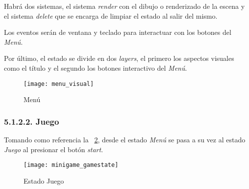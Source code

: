 Habrá dos sistemas, el sistema \textit{render} con el dibujo o renderizado de la escena
y el sistema \textit{delete} que se encarga de limpiar el estado al salir del mismo.

Los eventos serán de ventana y teclado para interactuar con los botones del \textit{Menú}.

Por último, el estado se divide en dos \textit{layers}, el primero los aspectos visuales como el título y
el segundo los botones interactivo del \textit{Menú}.

\begin{figure}[h!]
    \centering
    \texttt{[image: menu\_visual]}
    \caption{Menú}
    \label{menu_visual}
\end{figure}

\subsubsection*{5.1.2.2. Juego}\label{sec:minigame_gamestate}

Tomando como referencia la \figurename~\ref{minigame_gamestate}, desde el estado \textit{Menú} se pasa a su vez al estado \textit{Juego} al presionar el botón \textit{start}.
\begin{figure}[h!]
    \centering
    \texttt{[image: minigame\_gamestate]}
    \caption{Estado Juego}
    \label{minigame_gamestate}
\end{figure}

